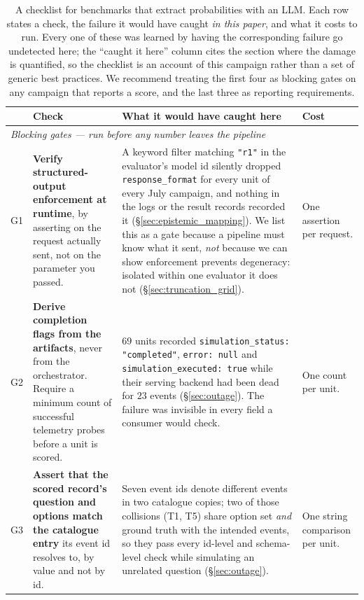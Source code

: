 \documentclass[11pt,journal,onecolumn]{IEEEtran}
\begin{document}
\begin{table}[!htbp]
\centering
\caption{A checklist for benchmarks that extract probabilities with an LLM. Each row states a check, the failure it would have caught \emph{in this paper}, and what it costs to run. Every one of these was learned by having the corresponding failure go undetected here; the ``caught it here'' column cites the section where the damage is quantified, so the checklist is an account of this campaign rather than a set of generic best practices. We recommend treating the first four as blocking gates on any campaign that reports a score, and the last three as reporting requirements.}
\label{tab:benchmark_checklist}
\footnotesize
\setlength{\tabcolsep}{4pt}
\begin{tabular}{p{}>{\raggedright\arraybackslash}p{}>{\raggedright\arraybackslash}p{}>{\raggedright\arraybackslash}p{}}
\toprule
& \textbf{Check} & \textbf{What it would have caught here} & \textbf{Cost} \\
\midrule
\multicolumn{4}{l}{\emph{Blocking gates --- run before any number leaves the pipeline}} \\
\midrule
G1 & \textbf{Verify structured-output enforcement at runtime}, by asserting on the request actually sent, not on the parameter you passed. & A keyword filter matching \texttt{"r1"} in the evaluator's model id silently dropped \texttt{response\_format} for every unit of every July campaign, and nothing in the logs or the result records recorded it (\S\ref{sec:epistemic_mapping}). We list this as a gate because a pipeline must know what it sent, \emph{not} because we can show enforcement prevents degeneracy: isolated within one evaluator it does not (\S\ref{sec:truncation_grid}). & One assertion per request. \\
\addlinespace
G2 & \textbf{Derive completion flags from the artifacts}, never from the orchestrator. Require a minimum count of successful telemetry probes before a unit is scored. & $69$ units recorded \texttt{simulation\_status: "completed"}, \texttt{error: null} and \texttt{simulation\_executed: true} while their serving backend had been dead for $23$ events (\S\ref{sec:outage}). The failure was invisible in every field a consumer would check. & One count per unit. \\
\addlinespace
G3 & \textbf{Assert that the scored record's question and options match the catalogue entry} its event id resolves to, by value and not by id. & Seven event ids denote different events in two catalogue copies; two of those collisions (T1, T5) share option set \emph{and} ground truth with the intended events, so they pass every id-level and schema-level check while simulating an unrelated question (\S\ref{sec:outage}). & One string comparison per unit. \\

\end{tabular}
\end{table}
\end{document}
